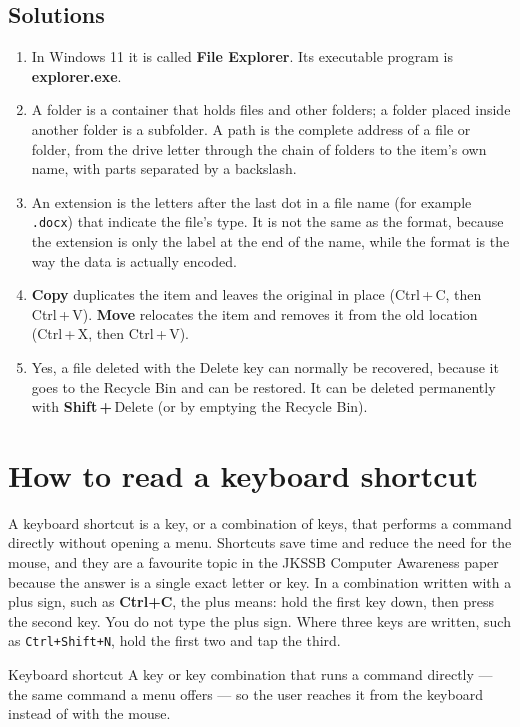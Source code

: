 \subsection*{Solutions}
\begingroup\small
\begin{enumerate}[label=\arabic*.]
  \item In Windows 11 it is called \textbf{File Explorer}. Its executable
    program is \textbf{explorer.exe}.
  \item A folder is a container that holds files and other folders; a folder
    placed inside another folder is a subfolder. A path is the complete
    address of a file or folder, from the drive letter through the chain of
    folders to the item's own name, with parts separated by a backslash.
  \item An extension is the letters after the last dot in a file name (for
    example \texttt{.docx}) that indicate the file's type. It is not the same
    as the format, because the extension is only the label at the end of the
    name, while the format is the way the data is actually encoded.
  \item \textbf{Copy} duplicates the item and leaves the original in place
    (Ctrl\,+\,C, then Ctrl\,+\,V). \textbf{Move} relocates the item and
    removes it from the old location (Ctrl\,+\,X, then Ctrl\,+\,V).
  \item Yes, a file deleted with the Delete key can normally be recovered,
    because it goes to the Recycle Bin and can be restored. It can be deleted
    permanently with \textbf{Shift\,+\,$\boxed{\text{Delete}}$} (or by
    emptying the Recycle Bin).
\end{enumerate}
\endgroup

\section{How to read a keyboard shortcut}
A keyboard shortcut is a key, or a combination of keys, that performs a
command directly without opening a menu. Shortcuts save time and reduce the
need for the mouse, and they are a favourite topic in the JKSSB Computer
Awareness paper because the answer is a single exact letter or key. In a
combination written with a plus sign, such as \textbf{Ctrl+C}, the plus means:
hold the first key down, then press the second key. You do not type the plus
sign. Where three keys are written, such as \texttt{Ctrl+Shift+N}, hold the
first two and tap the third.

\begin{definitionbox}{Keyboard shortcut}
A key or key combination that runs a command directly --- the same command a
menu offers --- so the user reaches it from the keyboard instead of with the
mouse.
\end{definitionbox}

